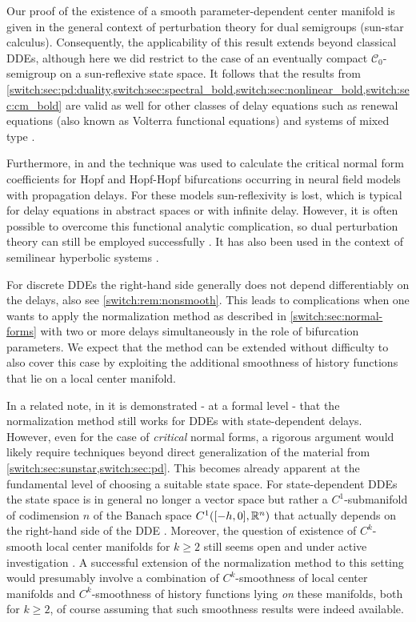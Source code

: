 Our proof of the existence of a smooth parameter-dependent center manifold is given in the general context of perturbation theory for dual semigroups (sun-star calculus). Consequently, the applicability of this result extends beyond classical DDEs, although here we did restrict to the case of an eventually compact $\mathcal{C}_0$-semigroup on a sun-reflexive state space. It follows that the results from \cref{switch:sec:pd:duality,switch:sec:spectral_bold,switch:sec:nonlinear_bold,switch:sec:cm_bold} are valid as well for other classes of delay equations such as renewal equations (also known as Volterra functional equations) and systems of mixed type \cite{diekmann2007stability}.

Furthermore, in \cite{VanGils2013} and \cite{Dijkstra2015} the technique was used to calculate the critical normal form coefficients for Hopf and Hopf-Hopf bifurcations occurring in neural field models with propagation delays. For these models sun-reflexivity is lost, which is typical for delay equations in abstract spaces or with infinite delay. However, it is often possible to overcome this functional analytic complication, so dual perturbation theory can still be employed successfully \cite{Diekmann2008,Diekmann2012blending,VanGils2013,Janssens2019}. It has also been used in the context of semilinear hyperbolic systems \cite{Lichtner2009hyperbolicsystems}.

For discrete DDEs the right-hand side generally does not depend differentiably on the delays, also see \cref{switch:rem:nonsmooth}. This leads to complications when one wants to apply the normalization method as described in \cref{switch:sec:normal-forms} with two or more delays simultaneously in the role of bifurcation parameters. We expect that the method can be extended without difficulty to also cover this case by exploiting the additional smoothness of history functions that lie on a local center manifold.

In a related note, in \cite{Sieber@2017} it is demonstrated - at a formal level - that the normalization method still works for DDEs with state-dependent delays. However, even for the case of \emph{critical} normal forms, a rigorous argument would likely require techniques beyond direct generalization of the material from \cref{switch:sec:sunstar,switch:sec:pd}. This becomes already apparent at the fundamental level of choosing a suitable state space. For state-dependent DDEs the state space is in general no longer a vector space but rather a $C^1$-submanifold of codimension $n$ of the Banach space $C^1([-h,0],\mathbb{R}^n)$ that actually depends on the right-hand side of the DDE \cite{Walther2003}. Moreover, the question of existence of $C^k$-smooth local center manifolds for $k \ge 2$ still seems open and under active investigation \cite{KrisztinWalther2017}. A successful extension of the normalization method to this setting would presumably involve a combination of $C^k$-smoothness of local center manifolds and $C^k$-smoothness of history functions lying \emph{on} these manifolds, both for $k \ge 2$, of course assuming that such smoothness results were indeed available. 

